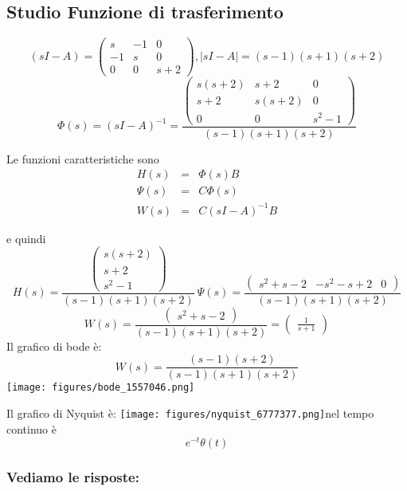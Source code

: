 \documentclass{article}
\begin{document}
\subsection{Studio Funzione di trasferimento}

\[ (sI-A) = \left(\begin{matrix}s & -1 & 0\\-1 & s & 0\\0 & 0 & s + 2\end{matrix}\right), |sI-A| = \left(s - 1\right) \left(s + 1\right) \left(s + 2\right) \]
\[ \Phi(s) = (sI-A)^{-1} = \frac{\left(\begin{matrix}s \left(s + 2\right) & s + 2 & 0\\s + 2 & s \left(s + 2\right) & 0\\0 & 0 & s^{2} - 1\end{matrix}\right)}{\left(s - 1\right) \left(s + 1\right) \left(s + 2\right)} \]

Le funzioni caratteristiche sono \[\begin{array}{rcl}  H(s) & = & \Phi(s)B \\ \Psi(s) & = & C \Phi(s)\\ W(s) & = & C(sI-A)^{-1}B  \end{array} \]

e quindi \[ H(s)  =  \frac{\left(\begin{matrix}s \left(s + 2\right)\\s + 2\\s^{2} - 1\end{matrix}\right)}{\left(s - 1\right) \left(s + 1\right) \left(s + 2\right)} \ \Psi(s) = \frac{\left(\begin{matrix}s^{2} + s - 2 & - s^{2} - s + 2 & 0\end{matrix}\right)}{\left(s - 1\right) \left(s + 1\right) \left(s + 2\right)} \]
\[ W(s)  =  \frac{\left(\begin{matrix}s^{2} + s - 2\end{matrix}\right)}{\left(s - 1\right) \left(s + 1\right) \left(s + 2\right)} = \left(\begin{matrix}\frac{1}{s + 1}\end{matrix}\right)  \] 
Il grafico di bode è:
\[ W(s) = \frac{\left(s - 1\right) \left(s + 2\right)}{\left(s - 1\right) \left(s + 1\right) \left(s + 2\right)} \]\texttt{[image: figures/bode\_1557046.png]}


Il grafico di Nyquist è:
\texttt{[image: figures/nyquist\_6777377.png]}nel tempo continuo è \[ e^{- t} \theta\left(t\right) \]
\subsubsection{Vediamo le risposte:} 
\end{document}
